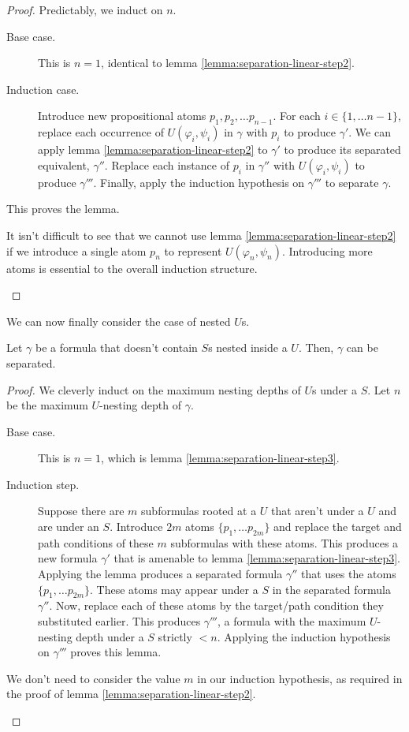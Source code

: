 \documentclass[a4paper,UKenglish,cleveref, autoref, thm-restate]{lipics-v2021}
\begin{document}
\begin{proof}
    Predictably, we induct on $n$.
    \begin{description}
        \item[Base case.] This is $n = 1$, identical to lemma \ref{lemma:separation-linear-step2}.
        \item[Induction case.] Introduce new propositional atoms $p_1, p_2, \ldots p_{n-1}$. For each $i \in \{1, \ldots n - 1\}$, replace each occurrence of $U(\varphi_i, \psi_i)$ in $\gamma$ with $p_i$ to produce $\gamma'$. We can apply lemma \ref{lemma:separation-linear-step2} to $\gamma'$ to produce its separated equivalent, $\gamma''$. Replace each instance of $p_i$ in $\gamma''$ with $U(\varphi_i, \psi_i)$ to produce $\gamma'''$. Finally, apply the induction hypothesis on $\gamma'''$ to separate $\gamma$.
    \end{description}
    This proves the lemma.
    \begin{remark*}
        It isn't difficult to see that we cannot use lemma \ref{lemma:separation-linear-step2} if we introduce a single atom $p_n$ to represent $U(\varphi_n, \psi_n)$. Introducing more atoms is essential to the overall induction structure.
    \end{remark*}
\end{proof}
We can now finally consider the case of nested $U$s.
\begin{lemma}
    \label{lemma:separation-linear-step4}
    Let $\gamma$ be a formula that doesn't contain $S$s nested inside a $U$. Then, $\gamma$ can be separated.
\end{lemma}
\begin{proof}
    We cleverly induct on the maximum nesting depths of $U$s under a $S$. Let $n$ be the maximum $U$-nesting depth of $\gamma$.
    \begin{description}
        \item[Base case.] This is $n = 1$, which is lemma \ref{lemma:separation-linear-step3}.
        \item[Induction step.] Suppose there are $m$ subformulas rooted at a $U$ that aren't under a $U$ and are under an $S$. Introduce $2m$ atoms $\{p_1, \ldots p_{2m}\}$ and replace the target and path conditions of these $m$ subformulas with these atoms. This produces a new formula $\gamma'$ that is amenable to lemma \ref{lemma:separation-linear-step3}. Applying the lemma produces a separated formula $\gamma''$ that uses the atoms $\{p_1, \ldots p_{2m}\}$. These atoms may appear under a $S$ in the separated formula $\gamma''$. Now, replace each of these atoms by the target/path condition they substituted earlier. This produces $\gamma'''$, a formula with the maximum $U$-nesting depth under a $S$ strictly $< n$. Applying the induction hypothesis on $\gamma'''$ proves this lemma.
    \end{description}
    \begin{remark*}
        We don't need to consider the value $m$ in our induction hypothesis, as required in the proof of lemma \ref{lemma:separation-linear-step2}.
    \end{remark*}
\end{proof}
\end{document}
